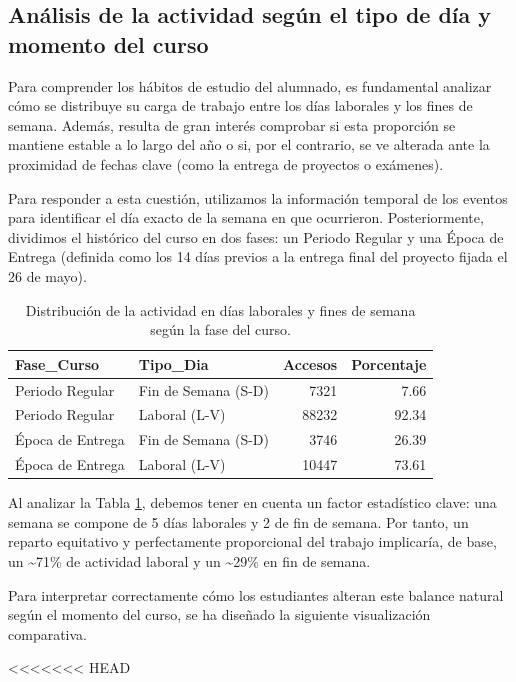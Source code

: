 \documentclass[notspecified,article,submit,moreauthors,pdftex]{Definitions/mdpi}
\begin{document}
\subsection{Análisis de la actividad según el tipo de día y momento del
curso}\label{anuxe1lisis-de-la-actividad-seguxfan-el-tipo-de-duxeda-y-momento-del-curso}

Para comprender los hábitos de estudio del alumnado, es fundamental
analizar cómo se distribuye su carga de trabajo entre los días laborales
y los fines de semana. Además, resulta de gran interés comprobar si esta
proporción se mantiene estable a lo largo del año o si, por el
contrario, se ve alterada ante la proximidad de fechas clave (como la
entrega de proyectos o exámenes).

Para responder a esta cuestión, utilizamos la información temporal de
los eventos para identificar el día exacto de la semana en que
ocurrieron. Posteriormente, dividimos el histórico del curso en dos
fases: un Periodo Regular y una Época de Entrega (definida como los 14
días previos a la entrega final del proyecto fijada el 26 de mayo).

\begin{longtable}[t]{llrr}
\caption{\label{tab:tabla-dias}Distribución de la actividad en días laborales y fines de semana según la fase del curso.}\\
\toprule
Fase\_Curso & Tipo\_Dia & Accesos & Porcentaje\\
\midrule
Periodo Regular & Fin de Semana (S-D) & 7321 & 7.66\\
Periodo Regular & Laboral (L-V) & 88232 & 92.34\\
Época de Entrega & Fin de Semana (S-D) & 3746 & 26.39\\
Época de Entrega & Laboral (L-V) & 10447 & 73.61\\
\bottomrule
\end{longtable}

Al analizar la Tabla \ref{tab:tabla-dias}, debemos tener en cuenta un
factor estadístico clave: una semana se compone de 5 días laborales y 2
de fin de semana. Por tanto, un reparto equitativo y perfectamente
proporcional del trabajo implicaría, de base, un \textasciitilde71\% de
actividad laboral y un \textasciitilde29\% en fin de semana.

Para interpretar correctamente cómo los estudiantes alteran este balance
natural según el momento del curso, se ha diseñado la siguiente
visualización comparativa.

\textless\textless\textless\textless\textless\textless\textless{} HEAD
\end{document}

